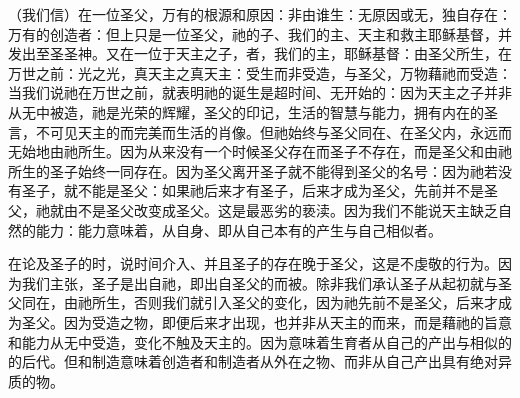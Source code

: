 （我们信）在一位圣父，万有的根源和原因：非由谁生：无原因或无，独自存在：万有的创造者：但上只是一位圣父，祂的子、我们的主、天主和救主耶稣基督，并发出至圣圣神。又在一位于天主之子，者，我们的主，耶稣基督：由圣父所生，在万世之前：光之光，真天主之真天主：受生而非受造，与圣父，万物藉祂而受造：当我们说祂在万世之前，就表明祂的诞生是超时间、无开始的：因为天主之子并非从无中被造，祂是光荣的辉耀，圣父的印记，生活的智慧与能力，拥有内在的圣言，不可见天主的而完美而生活的肖像。但祂始终与圣父同在、在圣父内，永远而无始地由祂所生。因为从来没有一个时候圣父存在而圣子不存在，而是圣父和由祂所生的圣子始终一同存在。因为圣父离开圣子就不能得到圣父的名号：因为祂若没有圣子，就不能是圣父：如果祂后来才有圣子，后来才成为圣父，先前并不是圣父，祂就由不是圣父改变成圣父。这是最恶劣的亵渎。因为我们不能说天主缺乏自然的能力：能力意味着，从自身、即从自己本有的产生与自己相似者。\par

在论及圣子的时，说时间介入、并且圣子的存在晚于圣父，这是不虔敬的行为。因为我们主张，圣子是出自祂，即出自圣父的而被。除非我们承认圣子从起初就与圣父同在，由祂所生，否则我们就引入圣父的变化，因为祂先前不是圣父，后来才成为圣父。因为受造之物，即便后来才出现，也并非从天主的而来，而是藉祂的旨意和能力从无中受造，变化不触及天主的。因为意味着生育者从自己的产出与相似的的后代。但和制造意味着创造者和制造者从外在之物、而非从自己产出具有绝对异质的物。\par


